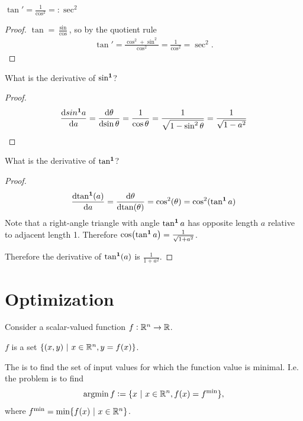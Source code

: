 \begin{claim*}
  $\tan' = \frac{1}{\cos^2} =: \sec^2$
\end{claim*}

\begin{proof}
  $\tan = \frac{\sin}{\cos}$, so by the quotient rule
  \begin{align*}
    \tan'
    = \frac{\cos^2 + \sin^2}{\cos^2}
    = \frac{1}{\cos^2}
    = \sec^2.
  \end{align*}
\end{proof}

\begin{claim*}
  What is the derivative of $\sin^{\mathbf 1}$?
\end{claim*}

\begin{proof}
  \begin{align*}
    \frac{\d sin^\1 a}{\d a}
    = \frac{\d \theta}{\d \sin \theta}
    = \frac{1}{\cos \theta}
    = \frac{1}{\sqrt{1 - \sin^2 \theta }}
    = \frac{1}{\sqrt{1 - a^2}}
  \end{align*}
\end{proof}


\begin{claim*}
  What is the derivative of $\tan^{\mathbf 1}$?
\end{claim*}

\begin{proof}
  \begin{align*}
    \frac{\d \tan^\1(a)}{\d a}
    = \frac{\d \theta}{\d \tan(\theta)}
    = \cos^2(\theta)
    = \cos^2(\tan^\1 a)
  \end{align*}
  Note that a right-angle triangle with angle $\tan^{\mathbf 1} a$ has opposite length $a$ relative to
  adjacent length 1. Therefore $\cos(\tan^{\mathbf 1} a) = \frac{1}{\sqrt{1 + a^2}}$.

  Therefore the derivative of $\tan^{\mathbf 1}(a)$ is $\frac{1}{1 + a^2}$.
\end{proof}

\section{Optimization}

Consider a scalar-valued function $f:\mathbb{R}^n \to \mathbb{R}$.

$f$ is a set $\{(x, y) ~|~ x \in \mathbb{R}^n, y = f(x) \}$.



\begin{definition*}
  The  is to find the set of input values for which the function value is
  minimal. I.e. the problem is to find
  \begin{align*}
    \operatorname*{argmin} f := \{ x ~|~ x \in \mathbb{R}^n, f(x) = f^{\text{min}} \},
  \end{align*}
  where $f^{\text{min}} = \min\{f(x) ~ | ~ x \in \mathbb{R}^n\}$.
\end{definition*}

